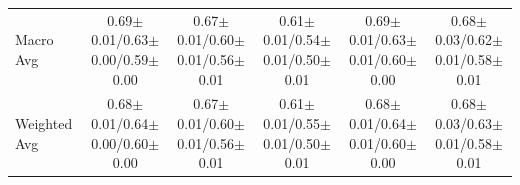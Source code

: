 \begin{table}[!t]
{\begin{tabular}{l|cccc|cccc|cccc|cccc|cccc}
Macro Avg & \multicolumn{4}{c|}{0.69$\pm$0.01/0.63$\pm$0.00/0.59$\pm$0.00} & \multicolumn{4}{c|}{0.67$\pm$0.01/0.60$\pm$0.01/0.56$\pm$0.01} & \multicolumn{4}{c|}{0.61$\pm$0.01/0.54$\pm$0.01/0.50$\pm$0.01} & \multicolumn{4}{c|}{0.69$\pm$0.01/0.63$\pm$0.01/0.60$\pm$0.00} & \multicolumn{4}{c}{0.68$\pm$0.03/0.62$\pm$0.01/0.58$\pm$0.01} \\
Weighted Avg & \multicolumn{4}{c|}{0.68$\pm$0.01/0.64$\pm$0.00/0.60$\pm$0.00} & \multicolumn{4}{c|}{0.67$\pm$0.01/0.60$\pm$0.01/0.56$\pm$0.01} & \multicolumn{4}{c|}{0.61$\pm$0.01/0.55$\pm$0.01/0.50$\pm$0.01} & \multicolumn{4}{c|}{0.68$\pm$0.01/0.64$\pm$0.01/0.60$\pm$0.00} & \multicolumn{4}{c}{0.68$\pm$0.03/0.63$\pm$0.01/0.58$\pm$0.01} \\
\bottomrule
\end{tabular}}
\end{table}


